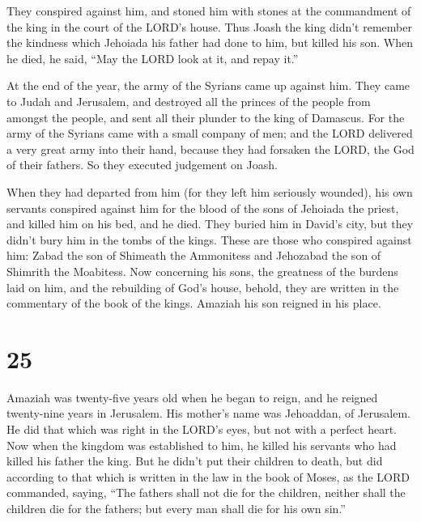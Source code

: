  They conspired against him, and stoned him with stones
at the commandment of the king in the court of the LORD's house.
 Thus Joash the king didn't remember the kindness which
Jehoiada his father had done to him, but killed his son. When he died,
he said, ``May the LORD look at it, and repay it.''

 At the end of the year, the army of the Syrians came up
against him. They came to Judah and Jerusalem, and destroyed all the
princes of the people from amongst the people, and sent all their
plunder to the king of Damascus.  For the army of the
Syrians came with a small company of men; and the LORD delivered a very
great army into their hand, because they had forsaken the LORD, the God
of their fathers. So they executed judgement on Joash.

 When they had departed from him (for they left him
seriously wounded), his own servants conspired against him for the blood
of the sons of Jehoiada the priest, and killed him on his bed, and he
died. They buried him in David's city, but they didn't bury him in the
tombs of the kings.  These are those who conspired
against him: Zabad the son of Shimeath the Ammonitess and Jehozabad the
son of Shimrith the Moabitess.  Now concerning his sons,
the greatness of the burdens laid on him, and the rebuilding of God's
house, behold, they are written in the commentary of the book of the
kings. Amaziah his son reigned in his place.

\hypertarget{section-24}{%
\section{25}\label{section-24}}

 Amaziah was twenty-five years old when he began to reign,
and he reigned twenty-nine years in Jerusalem. His mother's name was
Jehoaddan, of Jerusalem.  He did that which was right in
the LORD's eyes, but not with a perfect heart.  Now when
the kingdom was established to him, he killed his servants who had
killed his father the king.  But he didn't put their
children to death, but did according to that which is written in the law
in the book of Moses, as the LORD commanded, saying, ``The fathers shall
not die for the children, neither shall the children die for the
fathers; but every man shall die for his own sin.''

